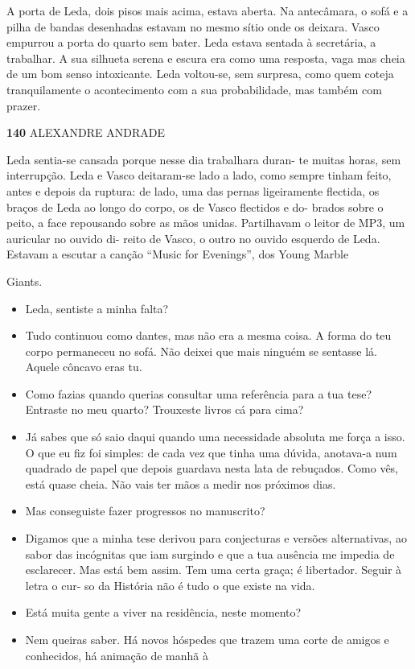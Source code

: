 A porta de Leda, dois pisos mais acima, estava aberta. Na antecâmara, o
sofá e a pilha de bandas desenhadas estavam no mesmo sítio onde os
deixara. Vasco empurrou a porta do quarto sem bater. Leda estava sentada
à secretária, a trabalhar. A sua silhueta serena e escura era como uma
resposta, vaga mas cheia de um bom senso intoxicante. Leda voltou-se,
sem surpresa, como quem coteja tranquilamente o acontecimento com a sua
probabilidade, mas também com prazer.

\textbf{140 }ALEXANDRE ANDRADE

Leda sentia-se cansada porque nesse dia trabalhara duran- te muitas
horas, sem interrupção. Leda e Vasco deitaram-se lado a lado, como
sempre tinham feito, antes e depois da ruptura: de lado, uma das pernas
ligeiramente flectida, os braços de Leda ao longo do corpo, os de Vasco
flectidos e do- brados sobre o peito, a face repousando sobre as mãos
unidas. Partilhavam o leitor de MP3, um auricular no ouvido di- reito de
Vasco, o outro no ouvido esquerdo de Leda. Estavam a escutar a canção
``Music for Evenings'', dos Young Marble

Giants.

\begin{itemize}
\tightlist
\item
  Leda, sentiste a minha falta?
\item
  Tudo continuou como dantes, mas não era a mesma coisa. A forma do teu
  corpo permaneceu no sofá. Não deixei que mais ninguém se sentasse lá.
  Aquele côncavo eras tu.
\item
  Como fazias quando querias consultar uma referência para a tua tese?
  Entraste no meu quarto? Trouxeste livros cá para cima?
\item
  Já sabes que só saio daqui quando uma necessidade absoluta me força a
  isso. O que eu fiz foi simples: de cada vez que tinha uma dúvida,
  anotava-a num quadrado de papel que depois guardava nesta lata de
  rebuçados. Como vês, está quase cheia. Não vais ter mãos a medir nos
  próximos dias.
\item
  Mas conseguiste fazer progressos no manuscrito?
\item
  Digamos que a minha tese derivou para conjecturas e versões
  alternativas, ao sabor das incógnitas que iam surgindo e que a tua
  ausência me impedia de esclarecer. Mas está bem assim. Tem uma certa
  graça; é libertador. Seguir à letra o cur- so da História não é tudo o
  que existe na vida.
\item
  Está muita gente a viver na residência, neste momento?
\item
  Nem queiras saber. Há novos hóspedes que trazem uma corte de amigos e
  conhecidos, há animação de manhã à
\end{itemize}


